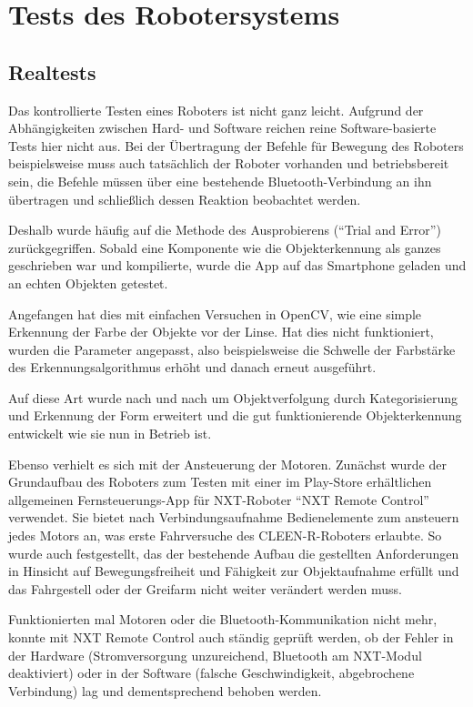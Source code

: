 \chapter{Tests des Robotersystems}
\label{cha:Tests}

\section{Realtests}

Das kontrollierte Testen eines Roboters ist nicht ganz leicht. Aufgrund der Abhängigkeiten zwischen Hard- und Software reichen reine Software-basierte Tests hier nicht aus. Bei der Übertragung der Befehle für Bewegung des Roboters beispielsweise muss auch tatsächlich der Roboter vorhanden und betriebsbereit sein, die Befehle müssen über eine bestehende Bluetooth-Verbindung an ihn übertragen und schließlich dessen Reaktion beobachtet werden.

Deshalb wurde häufig auf die Methode des Ausprobierens (\enquote{Trial and Error}) zurückgegriffen. Sobald eine Komponente wie die Objekterkennung als ganzes geschrieben war und kompilierte, wurde die App auf das Smartphone geladen und an echten Objekten getestet.

Angefangen hat dies mit einfachen Versuchen in OpenCV, wie eine simple Erkennung der Farbe der Objekte vor der Linse. Hat dies nicht funktioniert, wurden die Parameter angepasst, also beispielsweise die Schwelle der Farbstärke des Erkennungsalgorithmus erhöht und danach erneut ausgeführt. 

Auf diese Art wurde nach und nach um Objektverfolgung durch Kategorisierung und Erkennung der Form erweitert und die gut funktionierende Objekterkennung entwickelt wie sie nun in Betrieb ist.

Ebenso verhielt es sich mit der Ansteuerung der Motoren. Zunächst wurde der Grundaufbau des Roboters zum Testen mit einer im Play-Store erhältlichen allgemeinen Fernsteuerungs-App für NXT-Roboter \enquote{NXT Remote Control} \cite{nxt_remote_control} verwendet. Sie bietet nach Verbindungsaufnahme Bedienelemente zum ansteuern jedes Motors an, was erste Fahrversuche des CLEEN-R-Roboters erlaubte. So wurde auch festgestellt, das der bestehende Aufbau die gestellten Anforderungen in Hinsicht auf Bewegungsfreiheit und Fähigkeit zur Objektaufnahme erfüllt und das Fahrgestell oder der Greifarm nicht weiter verändert werden muss.

Funktionierten mal Motoren oder die Bluetooth-Kommunikation nicht mehr, konnte mit NXT Remote Control auch ständig geprüft werden, ob der Fehler in der Hardware (Stromversorgung unzureichend, Bluetooth am NXT-Modul deaktiviert) oder in der Software (falsche Geschwindigkeit, abgebrochene Verbindung) lag und dementsprechend behoben werden.

